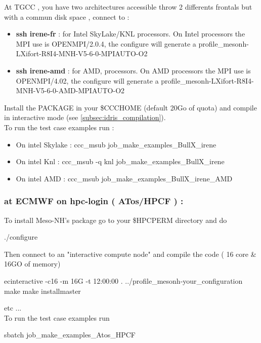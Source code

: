 At TGCC , you have two architectures accessible throw 2 differents frontals but with a commun disk space , connect to : 
\begin{itemize}
\item \textbf{ssh irene-fr} : for Intel SkyLake/KNL processors. On Intel processors the MPI use is OPENMPI/2.0.4, the configure will generate a profile\_mesonh-LXifort-R8I4-MNH-V5-6-0-MPIAUTO-O2
\item \textbf{ssh irene-amd} : for AMD, processors. On AMD processors the MPI use is OPENMPI/4.02, the configure  will generate a profile\_mesonh-LXifort-R8I4-MNH-V5-6-0-AMD-MPIAUTO-O2
\end{itemize}

Install the PACKAGE in your \$CCCHOME (default 20Go of quota) and compile in interactive mode (see \ref{subsec:idris_compilation}). \\

To run the test case examples  run :
\begin{itemize}
\item On intel Skylake : ccc\_msub job\_make\_examples\_BullX\_irene
\item On intel Knl : ccc\_msub -q knl job\_make\_examples\_BullX\_irene
\item On intel AMD : ccc\_msub job\_make\_examples\_BullX\_irene\_AMD
\end{itemize}

\subsubsection{at ECMWF on hpc-login ( ATos/HPCF ) :}

To install Meso-NH's package go to your \$HPCPERM directory and do
\begin{bashcode}
./configure
\end{bashcode}

Then connect to an "interactive compute node"  and compile the code ( 16 core & 16GO of memory)
\begin{bashcode}
ecinteractive -c16 -m 16G -t 12:00:00
. ../profile_mesonh-your_configuration
make
make installmaster
\end{bashcode}

etc ... \\

To run the test case examples  run
\begin{bashcode}
sbatch  job_make_examples_Atos_HPCF
\end{bashcode}

